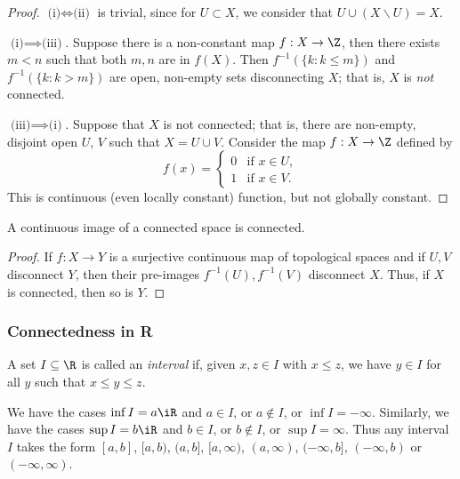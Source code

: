 \begin{proof}
	$\text{(i)} \iff \text{(ii)}$ is trivial, since for $U\subset X$, we consider that $U \cup (X\backslash U) = X$.

	$\text{(i)} \implies \text{(iii)}$. Suppose there is a non-constant map $f:X\to\Z$, then there exists $m<n$ such that both $m,n$ are in $f(X)$. Then $f^{-1}(\{k:k\leq m\})$ and $f^{-1}(\{k:k>m\})$ are open, non-empty sets disconnecting $X$; that is, $X$ is \emph{not} connected.

	$\text{(iii)} \implies \text{(i)}$. Suppose that $X$ is not connected; that is, there are non-empty, disjoint open $U$, $V$ such that $X=U\cup V$. Consider the map $f:X\to\Z$ defined by %
	\begin{equation*}
		f(x) =
		\begin{cases}
			0 & \text{if } x\in U, \\ %
			1 & \text{if } x\in V.
		\end{cases}
	\end{equation*}
	This is continuous (even locally constant) function, but not globally constant.
\end{proof}

\begin{proposition}
	A continuous image of a connected space is connected.
\end{proposition}

\begin{proof}
	If $f:X\to Y$ is a surjective continuous map of topological spaces and if $U, V$ disconnect $Y$, then their pre-images $f^{-1}(U), f^{-1}(V)$ disconnect $X$. Thus, if $X$ is connected, then so is $Y$.
\end{proof}

	\pagebreak

\subsubsection*{Connectedness in R} %
\label{ssub:connectedness_in_r}

\vspace{9pt}

\begin{definition}
	A set $I\subseteq \R$ is called an \emph{interval} if, given $x,z\in I$ with $x\leq z$, we have $y \in I$ for all $y$ such that $x\leq y\leq z$.

	We have the cases $\inf I=a\iR$ and $a\in I$, or $a\not\in I$, or $\inf I = -\infty$. Similarly, we have the cases $\sup I=b\iR$ and $b\in I$, or $b\not\in I$, or $\sup I = \infty$. Thus any interval $I$ takes the form $[a,b]$, $[a,b)$, $(a,b]$, $[a,\infty)$, $(a,\infty)$, $(-\infty,b]$, $(-\infty,b)$ or $(-\infty,\infty)$.
\end{definition}

